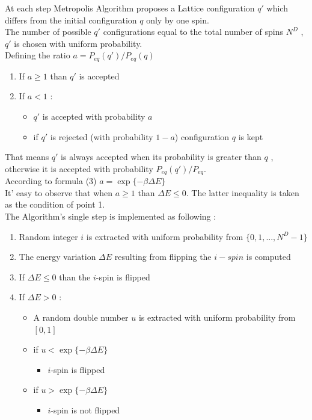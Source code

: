 \documentclass[11pt,a4paper]{article}
\begin{document}
At each step Metropolis Algorithm proposes a Lattice configuration $q'$ which differs from the initial configuration $q$ only by one spin.\\ 
The number of possible $q'$ configurations equal to the total number of spins $N^D$ , $q'$ is chosen with uniform probability.
\\Defining the ratio $a = P_{eq}(q')/P_{eq}(q)$ 
\begin{enumerate}
	\item If $a \geq 1$ than $q'$ is accepted 
	\item If $a < 1$ :
		\begin{itemize}
			\item[] $q'$ is accepted with probability $a$
			\item[] if $q'$ is rejected (with probability $1-a$) configuration $q$ is kept
		\end{itemize}				 
\end{enumerate}
That means $q'$ is always accepted when its probability is greater than $q$ , otherwise it is accepted with 
probability $P_{eq}(q')/P_{eq}$.\\
According to formula (3) $a = \exp \lbrace -\beta  \Delta E  \rbrace$ \\
It' easy to observe that when $a \geq 1$ than $ \Delta E \leq 0 $. The latter inequality is taken as the  condition of point 1.  
\\
The Algorithm's single step is implemented as following :
	
\begin{enumerate}
	
	\item Random integer $i$ is extracted with uniform probability from $\{0,1,...,N^D -1\}$
	\item The energy variation $ \Delta E $ resulting from flipping the $i-spin$ is computed		
	\item If $\Delta E \leq 0 $ than the $i$-spin is flipped
	\item If $\Delta E > 0 $ :
		\begin{itemize}
			\item[]  A random double number $u$ is extracted with uniform probability from $[0,1]$
			\item[]	 if $u < \exp \lbrace -\beta  \Delta E  \rbrace $					
			\begin{itemize}
				\item[] $i$-spin is flipped 
			\end{itemize}				 	 
			\item[]	 if $u > \exp \lbrace -\beta  \Delta E  \rbrace $
			\begin{itemize}
				\item[] $i$-spin is not flipped 
			\end{itemize}					
		\end{itemize}				 
\end{enumerate} 
   
\end{document}
